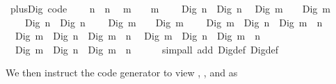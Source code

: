 \begin{isabellebody}
\isamarkuptrue%
%
\isadelimquote
%
\endisadelimquote
%
\isatagquote
{}\isamarkupfalse%
\ plus{\isacharunderscore}Dig\ {\isacharbrackleft}code{\isacharbrackright}{\isacharcolon}\isanewline
\ \ {\isachardoublequoteopen}{}\ {\isacharplus}\ n\ {\isacharequal}\ n{\isachardoublequoteclose}\isanewline
\ \ {\isachardoublequoteopen}m\ {\isacharplus}\ {}\ {\isacharequal}\ m{\isachardoublequoteclose}\isanewline
\ \ {\isachardoublequoteopen}{}\ {\isacharplus}\ Dig{}\ n\ {\isacharequal}\ Dig{}\ n{\isachardoublequoteclose}\isanewline
\ \ {\isachardoublequoteopen}Dig{}\ m\ {\isacharplus}\ {}\ {\isacharequal}\ Dig{}\ m{\isachardoublequoteclose}\isanewline
\ \ {\isachardoublequoteopen}{}\ {\isacharplus}\ Dig{}\ n\ {\isacharequal}\ Dig{}\ {\isacharparenleft}n\ {\isacharplus}\ {}{\isacharparenright}{\isachardoublequoteclose}\isanewline
\ \ {\isachardoublequoteopen}Dig{}\ m\ {\isacharplus}\ {}\ {\isacharequal}\ Dig{}\ {\isacharparenleft}m\ {\isacharplus}\ {}{\isacharparenright}{\isachardoublequoteclose}\isanewline
\ \ {\isachardoublequoteopen}Dig{}\ m\ {\isacharplus}\ Dig{}\ n\ {\isacharequal}\ Dig{}\ {\isacharparenleft}m\ {\isacharplus}\ n{\isacharparenright}{\isachardoublequoteclose}\isanewline
\ \ {\isachardoublequoteopen}Dig{}\ m\ {\isacharplus}\ Dig{}\ n\ {\isacharequal}\ Dig{}\ {\isacharparenleft}m\ {\isacharplus}\ n{\isacharparenright}{\isachardoublequoteclose}\isanewline
\ \ {\isachardoublequoteopen}Dig{}\ m\ {\isacharplus}\ Dig{}\ n\ {\isacharequal}\ Dig{}\ {\isacharparenleft}m\ {\isacharplus}\ n{\isacharparenright}{\isachardoublequoteclose}\isanewline
\ \ {\isachardoublequoteopen}Dig{}\ m\ {\isacharplus}\ Dig{}\ n\ {\isacharequal}\ Dig{}\ {\isacharparenleft}m\ {\isacharplus}\ n\ {\isacharplus}\ {}{\isacharparenright}{\isachardoublequoteclose}\isanewline
\ \ \isamarkupfalse%
\ {\isacharparenleft}simp{\isacharunderscore}all\ add{\isacharcolon}\ Dig{}{\isacharunderscore}def\ Dig{}{\isacharunderscore}def{\isacharparenright}%
\endisatagquote
{\isafoldquote}%
%
\isadelimquote
%
\endisadelimquote
%
\begin{isamarkuptext}%
\noindent We then instruct the code generator to view ,
  ,  and  as

\end{isamarkuptext}
\end{isabellebody}
